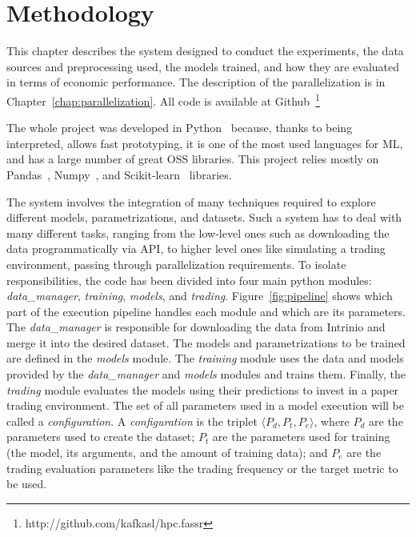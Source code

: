 \chapter{Methodology}
\label{chap:methodology} 

This chapter describes the system designed to conduct the experiments, the data sources and preprocessing used, the models trained, and how they are evaluated in terms of economic performance. The description of the parallelization is in Chapter~\ref{chap:parallelization}. All \HPCsys code is available at Github~\footnote{http://github.com/kafkasl/hpc.fassr}

The whole project was developed in Python~\cite{python} because, thanks to being interpreted, allows fast prototyping, it is one of the most used languages for ML, and has a large number of great OSS libraries. This project relies mostly on Pandas~\cite{pandas}, Numpy~\cite{numpy}, and Scikit-learn~\cite{scikit-learn} libraries.


The \HPCsys system involves the integration of many techniques required to explore different models, parametrizations, and datasets.
Such a system has to deal with many different tasks, ranging from the low-level ones such as downloading the data programmatically via API, to higher level ones like simulating a trading environment, passing through parallelization requirements. To isolate responsibilities, the code has been divided into four main python modules: \textit{data\_manager}, \textit{training}, \textit{models}, and \textit{trading}. Figure~\ref{fig:pipeline} shows which part of the execution pipeline handles each module and which are its parameters. 
The \textit{data\_manager} is responsible for downloading the data from Intrinio and merge it into the desired dataset. The models and parametrizations to be trained are defined in the \textit{models} module. The \textit{training} module uses the data and models provided by the \textit{data\_manager} and \textit{models} modules and trains them. Finally, the \textit{trading} module evaluates the models using their predictions to invest in a paper trading environment.
The set of all parameters used in a model execution will be called a \textit{configuration}. A \textit{configuration} is the triplet $\langle P_d, P_t, P_e \rangle$, where $P_d$ are the parameters used to create the dataset; $P_t$ are the parameters used for training (the model, its arguments, and the amount of training data); and $P_e$ are the trading evaluation parameters like the trading frequency or the target metric to be used.

